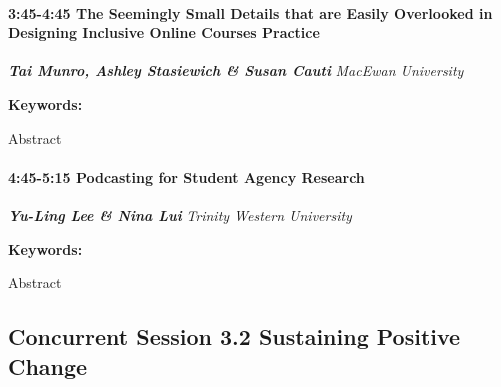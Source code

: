 \documentclass[
]{book}
\begin{document}
\begin{session}
\hypertarget{the-seemingly-small-details-that-are-easily-overlooked-in-designing-inclusive-online-courses-practice}{%
\paragraph*{\texorpdfstring{3:45-4:45 \textbar{} \textbf{The Seemingly
Small Details that are Easily Overlooked in Designing Inclusive Online
Courses} \textbar{}
Practice}{3:45-4:45 \textbar{} The Seemingly Small Details that are Easily Overlooked in Designing Inclusive Online Courses \textbar{} Practice}}\label{the-seemingly-small-details-that-are-easily-overlooked-in-designing-inclusive-online-courses-practice}}

\textbf{\emph{Tai Munro, Ashley Stasiewich \& Susan Cauti}} \textbar{}
\emph{MacEwan University}

\textbf{Keywords:}

Abstract
\end{session}

\begin{session}
\hypertarget{podcasting-for-student-agency-research}{%
\paragraph*{\texorpdfstring{4:45-5:15 \textbar{} \textbf{Podcasting for
Student Agency} \textbar{}
Research}{4:45-5:15 \textbar{} Podcasting for Student Agency \textbar{} Research}}\label{podcasting-for-student-agency-research}}

\textbf{\emph{Yu-Ling Lee \& Nina Lui}} \textbar{} \emph{Trinity Western
University}

\textbf{Keywords:}

Abstract
\end{session}

\hypertarget{concurrent-session-3.2-sustaining-positive-change}{%
\subsection*{Concurrent Session 3.2 \textbar{} Sustaining Positive Change}\label{concurrent-session-3.2-sustaining-positive-change}}
\end{document}
